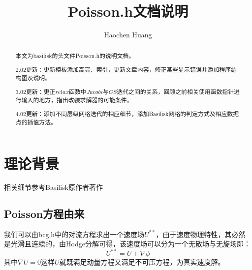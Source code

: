 \documentclass[lang=cn,11pt,a4paper]{elegantpaper}
\title{Poisson.h文档说明}
\author{Haochen Huang}
\institute{西安交通大学MFM课题组}
\date{\zhtoday}
\begin{document}
\maketitle
\tableofcontents

\begin{abstract}
本文为basilisk的头文件Poisson.h的说明文档。\par
2.02更新：更新模板添加高亮、索引，更新文章内容，修正某些显示错误并添加程序结构图及说明。\par
3.02更新：更正$relax$函数中$Jacobi$与$GS$迭代之间的关系，回顾之前相关使用函数指针进行输入的地方，指出改装求解器的可能条件。\par
4.02更新：添加不同层级网格迭代的相应细节，添加Basilisk网格的判定方式及相应数据点的插值方法。
\end{abstract}

\section{理论背景}
相关细节参考Basilisk原作者著作\cite{popinet2003gerris}\cite{popinet2015quadtree}
\subsection{Poisson方程由来}
我们可以由bcg.h中的对流方程求出一个速度场$U^{**}$，由于速度物理特性，其必然是光滑且连续的，由Hodge分解可得，该速度场可以分为一个无散场与无旋场即：
\begin{equation}
    U^{**} = U + \nabla \phi
\end{equation}
其中$\nabla U = 0$这样$U$就既满足动量方程又满足不可压方程，为真实速度解。
\end{document}
